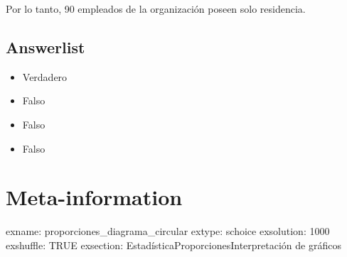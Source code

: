 \documentclass[
]{article}
\providecommand{\tightlist}{%
  \setlength{\itemsep}{0pt}\setlength{\parskip}{0pt}}
\begin{document}
Por lo tanto, 90 empleados de la organización poseen solo residencia.

\subsection{Answerlist}\label{answerlist-1}

\begin{itemize}
\tightlist
\item
  Verdadero
\item
  Falso
\item
  Falso
\item
  Falso
\end{itemize}

\section{Meta-information}\label{meta-information}

exname: proporciones\_diagrama\_circular extype: schoice exsolution:
1000 exshuffle: TRUE exsection:
Estadística\textbar Proporciones\textbar Interpretación de gráficos
\end{document}

